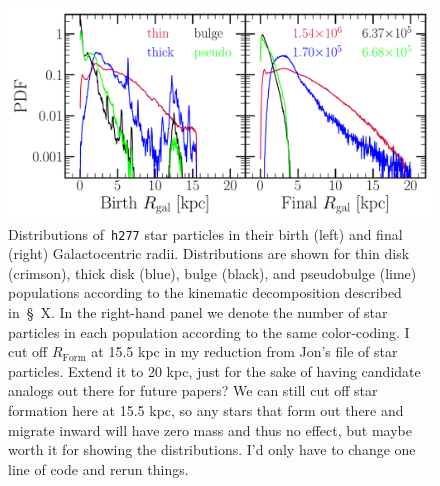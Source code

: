 \documentclass[a4paper, fleqn, usenatbib, useAMS]{mnras}
\begin{document}
\begin{figure} 
\centering 
\includegraphics[scale = 0.32]{birth_final_radii_pdfs.pdf} 
\caption{Distributions of~\texttt{h277} star particles in their birth (left) 
and final (right) Galactocentric radii. Distributions are shown for thin 
disk (crimson), thick disk (blue), bulge (black), and pseudobulge (lime) 
populations according to the kinematic decomposition described in~\S~X. 
In the right-hand panel we denote the number of star particles in each 
population according to the same color-coding. {\color{red} I cut off 
$R_\text{Form}$ at 15.5 kpc in my reduction from Jon's file of star 
particles. Extend it to 20 kpc, just for the sake of having candidate analogs 
out there for future papers? We can still cut off star formation here at 
15.5 kpc, so any stars that form out there and migrate inward will have zero 
mass and thus no effect, but maybe worth it for showing the distributions. 
I'd only have to change one line of code and rerun things. }} 
\label{fig:h277_birth_final_radii_pdfs} 
\end{figure} 
\end{document}
